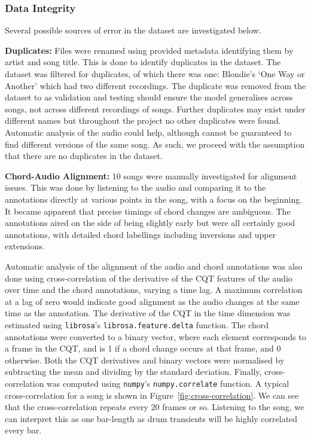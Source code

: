 \subsubsection{Data Integrity}\label{sec:data-integrity}

Several possible sources of error in the dataset are investigated below.

\textbf{Duplicates:} Files were renamed using provided metadata identifying them by artist and song title. This is done to identify duplicates in the dataset. The dataset was filtered for duplicates, of which there was one: Blondie's `One Way or Another' which had two different recordings. The duplicate was removed from the dataset to as validation and testing should ensure the model generalises across songs, not across different recordings of songs. Further duplicates may exist under different names but throughout the project no other duplicates were found. Automatic analysis of the audio could help, although cannot be guaranteed to find different versions of the same song. As such, we proceed with the assumption that there are no duplicates in the dataset.

\textbf{Chord-Audio Alignment:} 10 songs were manually investigated for alignment issues. This was done by listening to the audio and comparing it to the annotations directly at various points in the song, with a focus on the beginning. It became apparent that precise timings of chord changes are ambiguous. The annotations aired on the side of being slightly early but were all certainly good annotations, with detailed chord labellings including inversions and upper extensions.

Automatic analysis of the alignment of the audio and chord annotations was also done using cross-correlation of the derivative of the CQT features of the audio over time and the chord annotations, varying a time lag. A maximum correlation at a lag of zero would indicate good alignment as the audio changes at the same time as the annotation. The derivative of the CQT in the time dimension was estimated using \texttt{librosa}'s \texttt{librosa.feature.delta} function. The chord annotations were converted to a binary vector, where each element corresponds to a frame in the CQT, and is 1 if a chord change occurs at that frame, and 0 otherwise. Both the CQT derivatives and binary vectors were normalised by subtracting the mean and dividing by the standard deviation. Finally, cross-correlation was computed using \texttt{numpy}'s \texttt{numpy.correlate} function. A typical cross-correlation for a song is shown in Figure~\ref{fig:cross-correlation}. We can see that the cross-correlation repeats every 20 frames or so. Listening to the song, we can interpret this as one bar-length as drum transients will be highly correlated every bar. 

